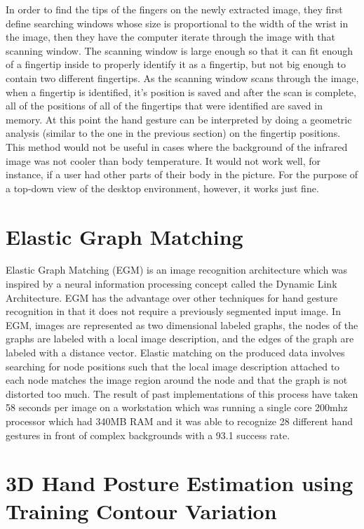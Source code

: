\documentclass[a4paper,12pt]{report}
\begin{document}
In order to find the tips of the fingers on the newly extracted image, they first define searching windows whose size is proportional to the width of the wrist in the image, then they have the computer iterate through the image with that scanning window. The scanning window is large enough so that it can fit enough of a fingertip inside to properly identify it as a fingertip, but not big enough to contain two different fingertips. As the scanning window scans through the image, when a fingertip is identified, it's position is saved and after the scan is complete, all of the positions of all of the fingertips that were identified are saved in memory. At this point the hand gesture can be interpreted by doing a geometric analysis (similar to the one in the previous section) on the fingertip positions. This method would not be useful in cases where the background of the infrared image was not cooler than body temperature. It would not work well, for instance, if a user had other parts of their body in the picture. For the purpose of a top-down view of the desktop environment, however, it works just fine.

\section{Elastic Graph Matching}

Elastic Graph Matching (EGM) \cite{egm} is an image recognition architecture which was inspired by a neural information processing concept called the Dynamic Link Architecture\cite{dla}. EGM has the advantage over other techniques for hand gesture recognition in that it does not require a previously segmented input image. In EGM, images are represented as two dimensional labeled graphs, the nodes of the graphs are labeled with a local image description, and the edges of the graph are labeled with a distance vector. Elastic matching on the produced data involves searching for node positions such that the local image description attached to each node matches the image region around the node and that the graph is not distorted too much\cite{egm}. The result of past implementations of this process have taken 58 seconds per image on a workstation which was running a single core 200mhz processor which had 340MB RAM and it was able to recognize 28 different hand gestures in front of complex backgrounds with a 93.1 success rate.

\section{3D Hand Posture Estimation using Training Contour Variation}
\end{document}
